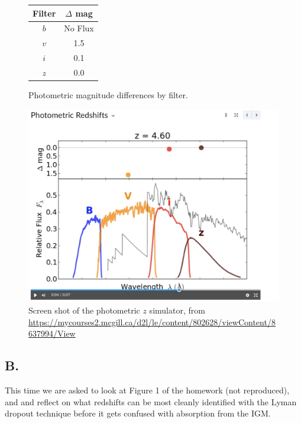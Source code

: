 \begin{figure}[H]
    \centering
    \begin{minipage}{0.45\linewidth}
        \centering
        \label{tab:filter_deltamag}
        \begin{tabular}{c c}
            \hline
            Filter & $\Delta$ mag \\
            \hline
            $b$ & No Flux \\
            $v$ & 1.5 \\
            $i$ & 0.1 \\
            $z$ & 0.0 \\
            \hline
        \end{tabular}
        \caption{Photometric magnitude differences by filter.}
    \end{minipage}%
    \hfill
    \begin{minipage}{0.45\linewidth}
        \centering
        \includegraphics[width=\linewidth]{images/maxfine_phy644_problemset_1_q1_redshift.png}
        \caption{Screen shot of the photometric $z$ simulator, from \url{https://mycourses2.mcgill.ca/d2l/le/content/802628/viewContent/8637994/View}}
        \label{fig:photometric_z}
    \end{minipage}
\end{figure}




\subsection*{B.}
This time we are asked to look at Figure 1 of the homework (not reproduced), and and reflect on what redshifts can be most cleanly identified with the Lyman dropout technique before it gets confused with absorption from the IGM.  

